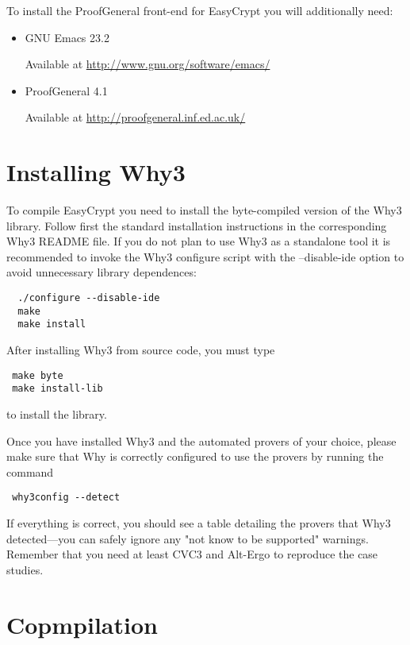 To install the ProofGeneral front-end for EasyCrypt you will
additionally need:

\begin{itemize}
\item GNU Emacs 23.2
 
  Available at \url{http://www.gnu.org/software/emacs/}

\item  ProofGeneral 4.1

  Available at \url{http://proofgeneral.inf.ed.ac.uk/}
\end{itemize}


\section{Installing Why3}

To compile EasyCrypt you need to install the byte-compiled version of
the Why3 library. Follow first the standard installation instructions 
in the corresponding Why3 README file. If you do not plan to use
Why3 as a standalone tool it is recommended to invoke the Why3 configure
script with the --disable-ide option to avoid unnecessary library 
dependences:
\begin{verbatim}
  ./configure --disable-ide
  make
  make install
\end{verbatim}
After installing Why3 from source code, you must type

\begin{verbatim}
 make byte
 make install-lib
\end{verbatim}

to install the library.

Once you have installed Why3 and the automated provers of your choice,
please make sure that Why is correctly configured to use the provers
by running the command

\begin{verbatim}
 why3config --detect
\end{verbatim}

If everything is correct, you should see a table detailing the provers
that Why3 detected---you can safely ignore any "not know to be
supported" warnings. Remember that you need at least CVC3 and Alt-Ergo
to reproduce the case studies.


\section{Copmpilation}

